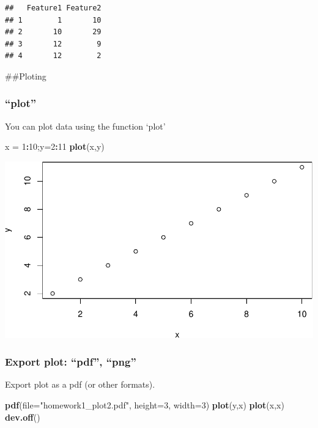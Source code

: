 \documentclass[]{article}
\newenvironment{Shaded}{\begin{snugshade}}{\end{snugshade}}
\newcommand{\DataTypeTok}[1]{\textcolor[rgb]{0.13,0.29,0.53}{#1}}
\newcommand{\DecValTok}[1]{\textcolor[rgb]{0.00,0.00,0.81}{#1}}
\newcommand{\KeywordTok}[1]{\textcolor[rgb]{0.13,0.29,0.53}{\textbf{#1}}}
\newcommand{\NormalTok}[1]{#1}
\newcommand{\OperatorTok}[1]{\textcolor[rgb]{0.81,0.36,0.00}{\textbf{#1}}}
\newcommand{\StringTok}[1]{\textcolor[rgb]{0.31,0.60,0.02}{#1}}
\begin{document}
\begin{verbatim}
##   Feature1 Feature2
## 1        1       10
## 2       10       29
## 3       12        9
## 4       12        2
\end{verbatim}

\#\#Ploting

\hypertarget{plot}{%
\subsubsection{``plot''}\label{plot}}

You can plot data using the function `plot'

\begin{Shaded}
\begin{Highlighting}[]
\NormalTok{x =}\StringTok{ }\DecValTok{1}\OperatorTok{:}\DecValTok{10}\NormalTok{;y=}\DecValTok{2}\OperatorTok{:}\DecValTok{11}
\KeywordTok{plot}\NormalTok{(x,y)}
\end{Highlighting}
\end{Shaded}

\includegraphics{tutorial_files/figure-latex/unnamed-chunk-32-1.pdf}

\hypertarget{export-plot-pdf-png}{%
\subsubsection{Export plot: ``pdf'',
``png''}\label{export-plot-pdf-png}}

Export plot as a pdf (or other formats).

\begin{Shaded}
\begin{Highlighting}[]
\KeywordTok{pdf}\NormalTok{(}\DataTypeTok{file=}\StringTok{"homework1_plot2.pdf"}\NormalTok{, }\DataTypeTok{height=}\DecValTok{3}\NormalTok{, }\DataTypeTok{width=}\DecValTok{3}\NormalTok{)}
\KeywordTok{plot}\NormalTok{(y,x)}
\KeywordTok{plot}\NormalTok{(x,x)}
\KeywordTok{dev.off}\NormalTok{()}
\end{Highlighting}
\end{Shaded}
\end{document}

